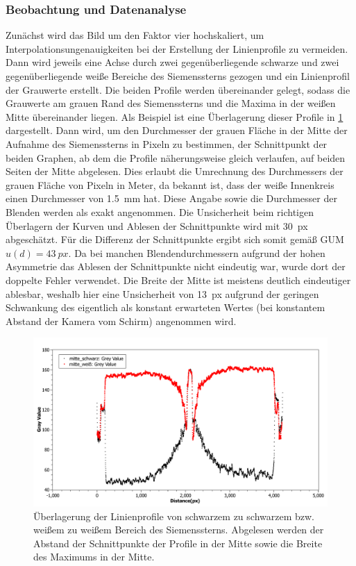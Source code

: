\documentclass[
	a4paper,
	12pt,
	pagesize,
	ngerman
]{scrartcl}
\begin{document}
	\subsubsection{Beobachtung und Datenanalyse}
	Zunächst wird das Bild um den Faktor vier hochskaliert, um Interpolationsungenauigkeiten bei der Erstellung der Linienprofile zu vermeiden.
	Dann wird jeweils eine Achse durch zwei gegenüberliegende schwarze und zwei gegenüberliegende weiße Bereiche des Siemenssterns gezogen und ein Linienprofil der Grauwerte erstellt.
	Die beiden Profile werden übereinander gelegt, sodass die Grauwerte am grauen Rand des Siemenssterns und die Maxima in der weißen Mitte  übereinander liegen.
	Als Beispiel ist eine Überlagerung dieser Profile in \cref{fig_einzel_linie} dargestellt.
	Dann wird, um den Durchmesser der grauen Fläche in der Mitte der Aufnahme des Siemenssterns in Pixeln zu bestimmen, der Schnittpunkt der beiden Graphen, ab dem die Profile näherungsweise gleich verlaufen, auf beiden Seiten der Mitte abgelesen.
	Dies erlaubt die Umrechnung des Durchmessers der grauen Fläche von Pixeln in Meter, da bekannt ist, dass der weiße Innenkreis einen Durchmesser von \SI{1,5}{mm} hat.
	Diese Angabe sowie die Durchmesser der Blenden werden als exakt angenommen.
	Die Unsicherheit beim richtigen Überlagern der Kurven und Ablesen der Schnittpunkte wird mit \SI{30}{px} abgeschätzt.
	Für die Differenz der Schnittpunkte ergibt sich somit gemäß GUM $u(d)= \SI{43}{px}$.
	Da bei manchen Blendendurchmessern aufgrund der hohen Asymmetrie das Ablesen der Schnittpunkte nicht eindeutig war, wurde dort der doppelte Fehler verwendet.
	Die Breite der Mitte ist meistens deutlich eindeutiger ablesbar, weshalb hier eine Unsicherheit von \SI{13}{px} aufgrund der geringen Schwankung des eigentlich als konstant erwarteten Wertes (bei konstantem Abstand der Kamera vom Schirm) angenommen wird.
	
	\begin{figure}[H]  
		\includegraphics[width=1\textwidth]{fig_Einzellinse_Linienprofil}%
		\centering
		\caption{
			Überlagerung der Linienprofile von schwarzem zu schwarzem bzw. weißem zu weißem Bereich des Siemenssterns.
			Abgelesen werden der Abstand der Schnittpunkte der Profile in der Mitte sowie die Breite des Maximums in der Mitte.
		}
		\label{fig_einzel_linie}
		\centering
	\end{figure}
	
\end{document}

